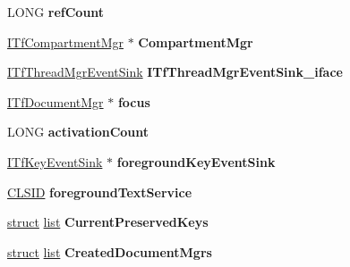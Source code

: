\begin{DoxyCompactItemize}
\item 
\mbox{\label{structtag_a_c_l_multi_a10417b872d9bc40d08bff79992e3c53d}} 
L\+O\+NG {\bfseries ref\+Count}
\item 
\mbox{\label{structtag_a_c_l_multi_ae38b284a38e57b8bf172a7afd2e7bfc0}} 
\hyperlink{interface_i_tf_compartment_mgr}{I\+Tf\+Compartment\+Mgr} $\ast$ {\bfseries Compartment\+Mgr}
\item 
\mbox{\label{structtag_a_c_l_multi_af332931a16a0c3beecb07e55f2d09d05}} 
\hyperlink{interface_i_tf_thread_mgr_event_sink}{I\+Tf\+Thread\+Mgr\+Event\+Sink} {\bfseries I\+Tf\+Thread\+Mgr\+Event\+Sink\+\_\+iface}
\item 
\mbox{\label{structtag_a_c_l_multi_a1659d6ec2e967ae1bc71d161f769d9b0}} 
\hyperlink{interface_i_tf_document_mgr}{I\+Tf\+Document\+Mgr} $\ast$ {\bfseries focus}
\item 
\mbox{\label{structtag_a_c_l_multi_a47f7e02c59c71fbc2a0456cfee8fb28b}} 
L\+O\+NG {\bfseries activation\+Count}
\item 
\mbox{\label{structtag_a_c_l_multi_aff182d9f9e83d84b6a8876ea3cbb7c99}} 
\hyperlink{interface_i_tf_key_event_sink}{I\+Tf\+Key\+Event\+Sink} $\ast$ {\bfseries foreground\+Key\+Event\+Sink}
\item 
\mbox{\label{structtag_a_c_l_multi_a96ea3913516d45f4831e2ee9bb74604c}} 
\hyperlink{struct___i_i_d}{C\+L\+S\+ID} {\bfseries foreground\+Text\+Service}
\item 
\mbox{\label{structtag_a_c_l_multi_ad174d17fa367bb9d0dfb2955a7b650a7}} 
\hyperlink{interfacestruct}{struct} \hyperlink{classlist}{list} {\bfseries Current\+Preserved\+Keys}
\item 
\mbox{\label{structtag_a_c_l_multi_ae1a26afd2478d15e302c1824bef39e07}} 
\hyperlink{interfacestruct}{struct} \hyperlink{classlist}{list} {\bfseries Created\+Document\+Mgrs}
\item 
\mbox{\label{structtag_a_c_l_multi_ab7f80e0012f99f4eddcb66f90bcdf96b}} 

\end{DoxyCompactItemize}
